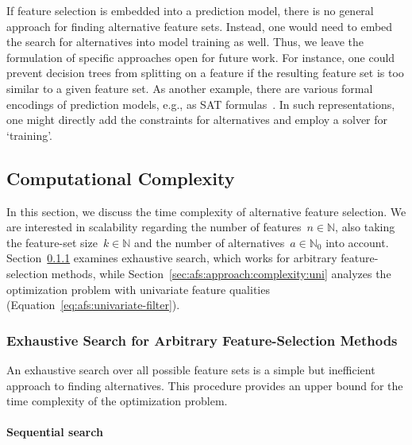 \documentclass[iicol, sn-basic, Numbered]{sn-jnl} %
\theoremstyle{plain}
\theoremstyle{definition}
\begin{document}
If feature selection is embedded into a prediction model, there is no general approach for finding alternative feature sets.
Instead, one would need to embed the search for alternatives into model training as well.
Thus, we leave the formulation of specific approaches open for future work.
For instance, one could prevent decision trees from splitting on a feature if the resulting feature set is too similar to a given feature set.
As another example, there are various formal encodings of prediction models, e.g., as \textsc{SAT} formulas~\cite{narodytska2018learning, schidler2021sat, yu2021learning}.
In such representations, one might directly add the constraints for alternatives and employ a solver for `training'.

\subsection{Computational Complexity}
\label{sec:afs:approach:complexity}

In this section, we discuss the time complexity of alternative feature selection.
We are interested in scalability regarding the number of features~$n \in \mathbb{N}$, also taking the feature-set size~$k \in \mathbb{N}$ and the number of alternatives~$a \in \mathbb{N}_0$ into account.
Section~\ref{sec:afs:approach:complexity:exhaustive} examines exhaustive search, which works for arbitrary feature-selection methods, while Section~\ref{sec:afs:approach:complexity:uni} analyzes the optimization problem with univariate feature qualities (Equation~\ref{eq:afs:univariate-filter}).

\subsubsection{Exhaustive Search for Arbitrary Feature-Selection Methods}
\label{sec:afs:approach:complexity:exhaustive}

An exhaustive search over all possible feature sets is a simple but inefficient approach to finding alternatives. 
This procedure provides an upper bound for the time complexity of the optimization problem.

\paragraph{Sequential search}
\end{document}
